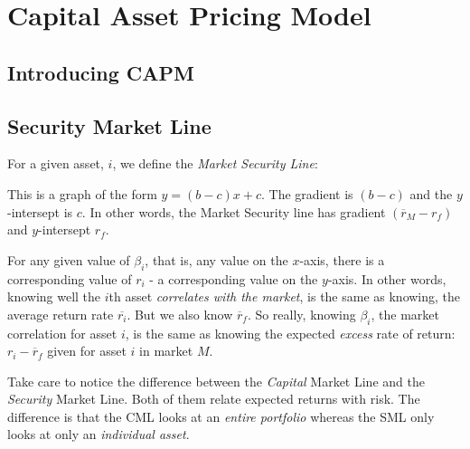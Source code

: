 
\chapter{Capital Asset Pricing Model}



\section{Introducing CAPM}









\section{Security Market Line}

For a given asset, $i$, we define the \textit{Market Security Line}: 

This is a graph of the form $y = (b-c)x + c$. 
The gradient is $(b-c)$ and the $y$-intersept is $c$. 
In other words, the Market Security line has gradient $(\overline{r}_M - r_f)$ 
and $y$-intersept $r_f$.

For any given value of $\beta_i$, that is, any value on the $x$-axis, 
there is a corresponding value of $r_i$ - a corresponding value on the $y$-axis. 
In other words, knowing well the $i$th asset \textit{correlates with the market}, 
is the same as knowing, the average return rate $\overline{r_i}$. 
But we also know $\overline{r}_f$. So really, knowing $\beta_i$, the market 
correlation for asset $i$, is the same as knowing the expected \textit{excess} rate 
of return: $r_i - \overline{r}_f$ given for asset $i$ in market $M$. 

Take care to notice the difference between the \textit{Capital} Market Line and 
the \textit{Security} Market Line. Both of them relate expected returns with 
risk. The difference is that the CML looks at an \textit{entire portfolio} whereas 
the SML only looks at only an \textit{individual asset}.  

